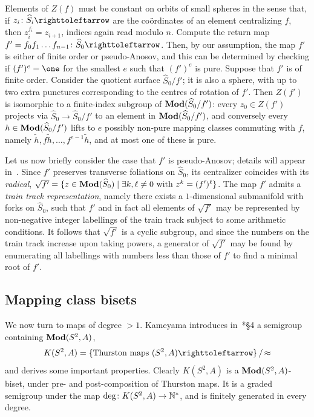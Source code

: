 \documentclass{amsart}
\begin{document}
\begin{algo}
\begin{enumerate}
    Elements of $Z(f)$ must be constant on orbits of small spheres in
    the sense that, if $z_i\colon \widehat S_i\selfmap$ are the
    co\"ordinates of an element centralizing $f$, then
    $z_i^{f_i}=z_{i+1}$, indices again read modulo $n$. Compute the
    return map $f'=f_0f_1\dots f_{n-1}\colon \widehat
    S_0\selfmap$. Then, by our assumption, the map $f'$ is either of
    finite order or pseudo-Anosov, and this can be determined by
    checking if $(f')^e=\one$ for the smallest $e$ such that $(f')^e$
    is pure. Suppose that $f'$ is of finite order. Consider the
    quotient surface $\widehat S_0/f'$; it is also a sphere, with up
    to two extra punctures corresponding to the centres of rotation of
    $f'$. Then $Z(f')$ is isomorphic to a finite-index subgroup of
    $\mathbf{\relax Mod}(\widehat S_0/f')$: every $z_0\in Z(f')$ projects via
    $\widehat S_0\to \widehat S_0/f'$ to an element in $\mathbf{\relax Mod}(\widehat
    S_0/f')$, and conversely every $h\in\mathbf{\relax Mod}(\widehat S_0/f')$ lifts
    to $e$ possibly non-pure mapping classes commuting with $f$,
    namely $\widetilde h,f\widetilde h,\dots,f^{e-1}\widetilde h$, and
    at most one of these is pure.
    
    Let us now briefly consider the case that $f'$ is pseudo-Anosov;
    details will appear in~\cite{bartholdi-dudko:bc5}. Since $f'$
    preserves transverse foliations on $\widehat S_0$, its centralizer
    coincides with its \emph{radical},
    $\sqrt{f'}=\{z\in\mathbf{\relax Mod}(\widehat S_0)\mid \exists k,\ell\neq 0\text{
      with }z^k=(f')^\ell\}$. The map $f'$ admits a \emph{train track
      representation}, namely there exists a $1$-dimensional
    submanifold with forks on $\widehat S_0$, such that $f'$ and in
    fact all elements of $\sqrt{f'}$ may be represented by
    non-negative integer labellings of the train track subject to some
    arithmetic conditions. It follows that $\sqrt{f'}$ is a cyclic
    subgroup, and since the numbers on the train track increase upon
    taking powers, a generator of $\sqrt{f'}$ may be found by
    enumerating all labellings with numbers less than those of $f'$ to
    find a minimal root of $f'$.
  \end{enumerate}
\end{algo}

\subsection{Mapping class bisets}\label{ss:mcb}
We now turn to maps of degree $>1$.  Kameyama introduces
in~\cite{kameyama:thurston}*{\S4} a semigroup containing
$\mathbf{\relax Mod}(S^2,A)$,
\[K(S^2,A)=\{\text{Thurston maps }(S^2,A)\selfmap\}\,/\,{\approx}
\]
and derives some important properties. Clearly $K(S^2,A)$ is a
$\mathbf{\relax Mod}(S^2,A)$-biset, under pre- and post-composition of Thurston
maps. It is a graded semigroup under the map
$\deg\colon K(S^2,A)\to{\mathbb N}^*$, and is finitely generated in every
degree.
\end{document}
